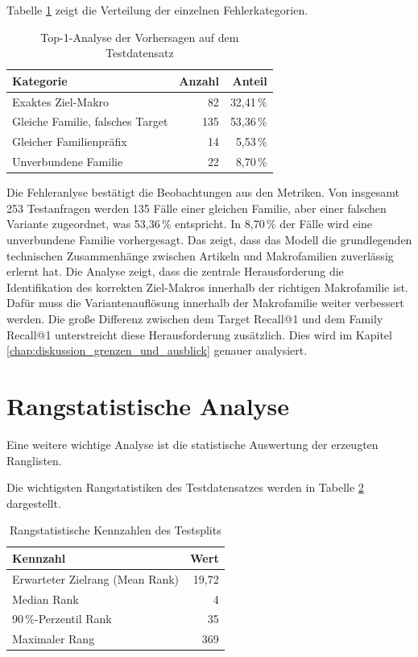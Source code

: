 Tabelle \ref{tab:fehleranalyse_top1} zeigt die Verteilung der einzelnen Fehlerkategorien. 

\begin{table}[tbp] 
  \centering 
  \caption{Top-1-Analyse der Vorhersagen auf dem Testdatensatz} 
  \label{tab:fehleranalyse_top1} 
  \begin{tabular}{lrr} 
    \toprule 
    \textbf{Kategorie} & \textbf{Anzahl} & \textbf{Anteil} \\ 
    \midrule 
    Exaktes Ziel-Makro \parencite{EPLAN-Makros} & 82 & 32,41\,\% \\ 
    Gleiche Familie, falsches Target & 135 & 53,36\,\% \\ 
    Gleicher Familienpräfix & 14 & 5,53\,\% \\ 
    Unverbundene Familie & 22 & 8,70\,\% \\ 
    \bottomrule 
  \end{tabular} 
\end{table}

Die Fehleranlyse bestätigt die Beobachtungen aus den Metriken. Von insgesamt 253 Testanfragen werden 135 Fälle einer gleichen Familie, aber einer falschen Variante zugeordnet, was 53,36\,\% entspricht.
In 8,70\,\% der Fälle wird eine unverbundene Familie vorhergesagt. Das zeigt, dass das Modell die grundlegenden technischen Zusammenhänge zwischen Artikeln und Makrofamilien zuverlässig erlernt hat.
Die Analyse zeigt, dass die zentrale Herausforderung die Identifikation des korrekten Ziel-Makros \parencite{EPLAN-Makros} innerhalb der richtigen Makrofamilie ist. Dafür muss die Variantenauflösung innerhalb der Makrofamilie weiter verbessert werden.
Die große Differenz zwischen dem Target Recall@1 und dem Family Recall@1 unterstreicht diese Herausforderung zusätzlich.
Dies wird im Kapitel \ref{chap:diskussion_grenzen_und_ausblick} genauer analysiert.


\section{Rangstatistische Analyse}

Eine weitere wichtige Analyse ist die statistische Auswertung der erzeugten Ranglisten.


Die wichtigsten Rangstatistiken des Testdatensatzes werden in Tabelle \ref{tab:rangstatistik} dargestellt.

\begin{table}[tbp] 
  \centering 
  \caption{Rangstatistische Kennzahlen des Testsplits} 
  \label{tab:rangstatistik} 
  \begin{tabular}{lr} 
    \toprule 
    \textbf{Kennzahl} & \textbf{Wert} \\ 
    \midrule 
    Erwarteter Zielrang (Mean Rank) & 19,72 \\ 
    Median Rank & 4 \\ 
    90\,\%-Perzentil Rank & 35 \\ 
    Maximaler Rang & 369 \\ 
    \bottomrule 
  \end{tabular} 
\end{table}

